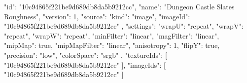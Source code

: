 {
  "id": "10c94865f221be9d689db8da5b9212cc",
  "name": "Dungeon Castle Slates Roughness",
  "version": 1,
  "source": {
    "kind": "image",
    "imageId": "10c94865f221be9d689db8da5b9212cc"
  },
  "settings": {
    "wrapU": "repeat",
    "wrapV": "repeat",
    "wrapW": "repeat",
    "minFilter": "linear",
    "magFilter": "linear",
    "mipMap": true,
    "mipMapFilter": "linear",
    "anisotropy": 1,
    "flipY": true,
    "precision": "low",
    "colorSpace": "srgb"
  },
  "textureIds": [
    "10c94865f221be9d689db8da5b9212cc"
  ],
  "imageIds": [
    "10c94865f221be9d689db8da5b9212cc"
  ]
}
